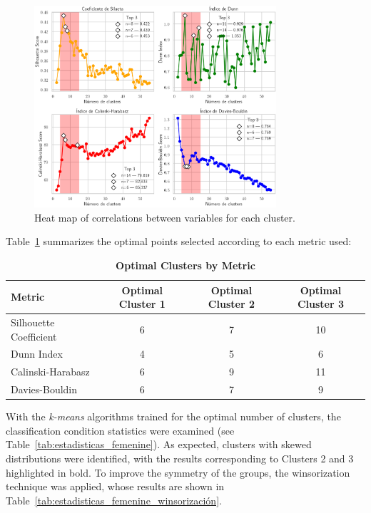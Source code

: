 \documentclass[10pt]{article}
\begin{document}
\begin{figure}[h]
    \centering
    \includegraphics[width=0.8\textwidth]{plots_investing/Grafico 16.png}
    \caption{Heat map of correlations between variables for each cluster.}
    \label{fig:miGrafico16}
\end{figure}

Table~\ref{tab:clusters_optimos} summarizes the optimal points selected according to each metric used:

\begin{table}[htbp]
    \centering
    \caption{\textbf{Optimal Clusters by Metric}}
    \label{tab:clusters_optimos}
    \renewcommand{\arraystretch}{1.2}
    \begin{tabular}{@{}lccc@{}}
        \toprule
        \textbf{Metric}         & \textbf{Optimal Cluster 1} & \textbf{Optimal Cluster 2} & \textbf{Optimal Cluster 3} \\
        \midrule
        Silhouette Coefficient   & 6                       & 7                        & 10                      \\
        Dunn Index               & 4                       & 5                        & 6                       \\
        Calinski-Harabasz        & 6                       & 9                        & 11                      \\
        Davies-Bouldin           & 6                       & 7                        & 9                       \\
        \bottomrule
    \end{tabular}
\end{table}

With the \textit{k-means} algorithms trained for the optimal number of clusters, the classification condition statistics were examined (see Table~\ref{tab:estadisticas_femenine}). As expected, clusters with skewed distributions were identified, with the results corresponding to Clusters 2 and 3 highlighted in bold. To improve the symmetry of the groups, the winsorization technique was applied, whose results are shown in Table~\ref{tab:estadisticas_femenine_winsorización}.
\end{document}
